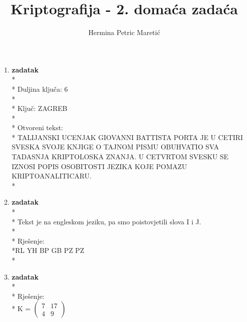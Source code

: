 \documentclass[11pt]{article} %
\title{Kriptografija - 2. domaća zadaća}
\author{Hermina Petric Maretić}
\begin{document}
\maketitle

\begin{enumerate}
\item \textbf{zadatak}
\\*
\\*
Duljina ključa: 6
\\*
\\*
Ključ: ZAGREB
\\*
\\*
Otvoreni tekst: 
\\*
TALIJANSKI UCENJAK GIOVANNI BATTISTA PORTA JE U CETIRI SVESKA SVOJE KNJIGE O TAJNOM PISMU OBUHVATIO SVA TADASNJA KRIPTOLOSKA ZNANJA. U CETVRTOM SVESKU SE IZNOSI POPIS OSOBITOSTI JEZIKA KOJE POMAZU KRIPTOANALITICARU.
\\*
\item \textbf{zadatak}
\\*
\\*
Tekst je na engleskom jeziku, pa smo poistovjetili slova I i J.
\\*
\\*
Rješenje: \\*RL YH BP GB PZ PZ
\\*
\item \textbf{zadatak}
\\*
\\*
Rješenje:
\\*
K = 
$
\begin{pmatrix}
          7 & 17 \\
          4 & 9
\end{pmatrix} 
$
\end{enumerate}
\end{document}
